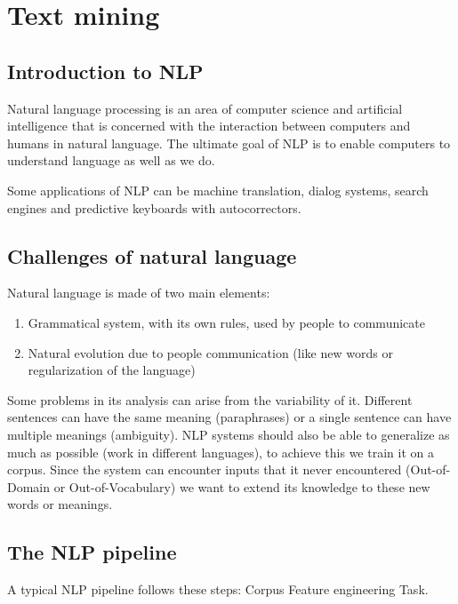 \section{Text mining}

\subsection{Introduction to NLP}

Natural language processing is an area of computer science and artificial intelligence that is concerned with the interaction between computers and humans in natural language. The ultimate goal of NLP is to enable computers to understand language as well as we do.

Some applications of NLP can be machine translation, dialog systems, search engines and predictive keyboards with autocorrectors. 

\subsection{Challenges of natural language}

Natural language is made of two main elements:
\begin{enumerate}
    \item Grammatical system, with its own rules, used by people to communicate
    \item Natural evolution due to people communication (like new words or regularization of the language)
\end{enumerate}

\vspace{10pt}

Some problems in its analysis can arise from the variability of it. Different sentences can have the same meaning (paraphrases) or a single sentence can have multiple meanings (ambiguity). NLP systems should also be able to generalize as much as possible (work in different languages), to achieve this we train it on a corpus. Since the system can encounter inputs that it never encountered (Out-of-Domain or Out-of-Vocabulary) we want to extend its knowledge to these new words or meanings.


\subsection{The NLP pipeline}

A typical NLP pipeline follows these steps: Corpus \ra Feature engineering \ra Task.

